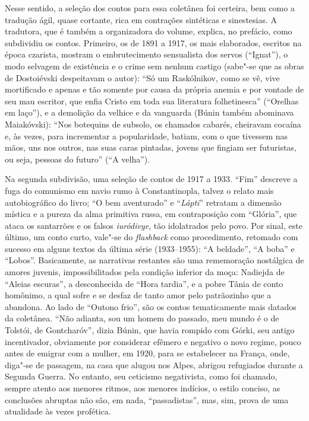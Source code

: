 Nesse sentido, a seleção dos contos para essa coletânea foi certeira, bem como a tradução ágil, quase cortante, rica em
contrações sintéticas e sinestesias. A tradutora, que é também
a organizadora do volume, explica, no prefácio, como subdividiu
os contos. Primeiro, os de 1891 a 1917, os mais elaborados,
escritos na época czarista, mostram o embrutecimento sensualista
dos servos (``Ignat''), o modo selvagem de existência e o crime
sem nenhum castigo (sabe"-se que as obras de Dostoiévski
despeitavam o autor): ``Só um Raskólnikov, como se vê, vive
mortificado e apenas e tão somente por causa da própria anemia
e por vontade de seu mau escritor, que enfia Cristo em toda sua
literatura folhetinesca'' (``Orelhas em laço''), e a demolição
da velhice e da vanguarda (Búnin também abominava Maiakóvski):
``Nos botequins de subsolo, os chamados cabarés, cheiravam
cocaína e, às vezes, para incrementar a popularidade, batiam,
com o que tivessem nas mãos, uns nos outros, nas suas caras
pintadas, jovens que fingiam ser futuristas, ou seja, pessoas
do futuro'' (``A velha''). 

Na segunda subdivisão, uma seleção de contos de 1917 a 1933.
``Fim'' descreve a fuga do comunismo em navio rumo à Constantinopla,
talvez o relato mais autobiográfico do livro; ``O bem aventurado''
e ``\emph{Lápti}'' retratam  a dimensão mística e a pureza da alma
primitiva russa, em contraposição com ``Glória'', que ataca os
santarrões e os falsos \emph{iuródivye}, tão idolatrados pelo
povo. Por sinal, este último, um conto curto, vale"-se do
\emph{flashback} como procedimento, retomado com sucesso em
alguns textos da última série (1933--1955): ``A beldade'',
``A boba'' e ``Lobos''. Basicamente, as narrativas restantes
são uma rememoração nostálgica de amores juvenis, impossibilitados
pela condição inferior da moça: Nadiejda de ``Aleias escuras'',
a desconhecida de ``Hora tardia'', e a pobre Tânia de conto
homônimo, a qual sofre e se desfaz de tanto amor pelo patrãozinho
que a abandona. Ao lado de ``Outono frio'', são os contos
tematicamente mais datados da coletânea. ``Não adianta, sou um
homem do passado, meu mundo é o de Tolstói, de Gontcharóv'',
dizia Búnin, que havia rompido com Górki, seu antigo incentivador,
obviamente por considerar efêmero e negativo o novo regime,
pouco antes de emigrar com a mulher, em 1920, para se estabelecer
na França, onde, diga"-se de passagem,  na casa que
alugou nos Alpes, abrigou refugiados durante a Segunda Guerra.
No entanto, seu ceticismo negativista, como foi chamado, sempre
atento aos menores ritmos, aos menores indícios, o estilo conciso,
as conclusões abruptas não são, em nada, ``passadistas'', mas,
sim, prova de uma atualidade às vezes profética. 

